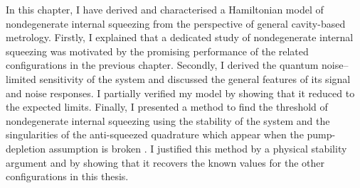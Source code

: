 In this chapter, I have derived and characterised a Hamiltonian model of nondegenerate internal squeezing from the perspective of general cavity-based metrology. Firstly, I explained that a dedicated study of nondegenerate internal squeezing was motivated by the promising performance of the related configurations in the previous chapter. Secondly, I derived the quantum noise--limited sensitivity of the system and discussed the general features of its signal and noise responses. I partially verified my model by showing that it reduced to the expected limits. Finally, I presented a method to find the threshold of nondegenerate internal squeezing using the stability of the system and the singularities of the anti-squeezed quadrature which appear when the pump-depletion assumption is broken . I justified this method by a physical stability argument and by showing that it recovers the known values for the other configurations in this thesis. 




